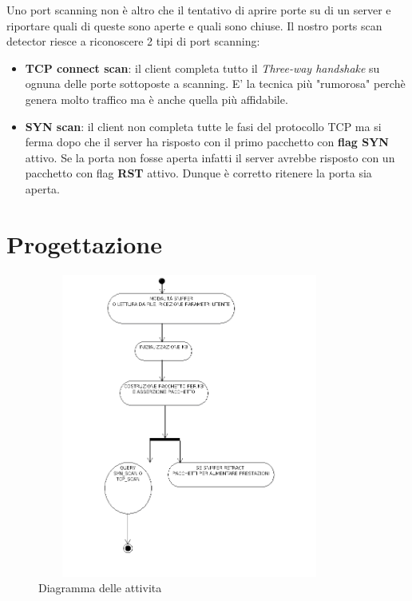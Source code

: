 \documentclass[a4paper,12pt]{article} %
\begin{document}
\newpage

Uno port scanning non è altro che il tentativo di aprire porte su di un server e riportare quali di queste sono aperte e quali sono
chiuse. Il nostro ports scan detector riesce a riconoscere 2 tipi di port scanning:

\begin{itemize}

\item \textbf{TCP connect scan}: il client completa tutto il \emph{Three-way handshake} su 
ognuna delle porte sottoposte a scanning. E' la tecnica più "rumorosa" perchè genera molto traffico ma è anche quella più
affidabile.

\item \textbf{SYN scan}: il client non completa tutte le fasi del protocollo TCP ma si ferma dopo che il server ha risposto con 
il primo pacchetto con \textbf{flag SYN} attivo. Se la porta non fosse aperta infatti il server avrebbe risposto con un pacchetto con 
flag \textbf{RST} attivo. Dunque è corretto ritenere la porta sia aperta.

\end{itemize}




\section{Progettazione}


\begin{figure}[htbp]
\centering
\includegraphics[width=10cm,height=10cm]{attivita.png}
\caption{\label{Diagramma delle attivita} Diagramma delle attivita}
\end{figure}
\end{document}
